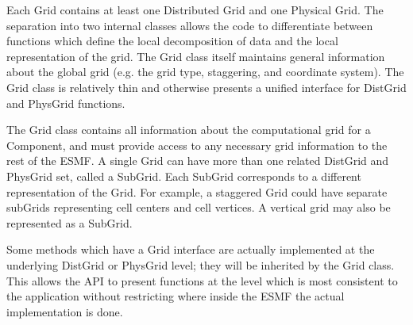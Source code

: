 

Each Grid contains at least one Distributed Grid and one Physical Grid.  
The separation into two internal classes allows the code to differentiate
between functions which define the local decomposition of data and
the local representation of the grid.  The Grid class itself maintains
general information about the global grid (e.g. the grid type, staggering,
and coordinate system).  The Grid class is relatively thin and
otherwise presents a unified interface for DistGrid and PhysGrid
functions.

The Grid class contains all information about the computational grid
for a Component, and must provide access to any necessary grid information
to the rest of the ESMF.  A single Grid can have more than one related
DistGrid and PhysGrid set, called a SubGrid.  Each SubGrid corresponds to
a different representation of the Grid.  For example, a staggered Grid could
have separate subGrids representing cell centers and cell vertices.  A
vertical grid may also be represented as a SubGrid.

Some methods which have a Grid interface are actually implemented
at the underlying DistGrid or PhysGrid level; they will be inherited
by the Grid class.  This allows the API to present functions at the 
level which is most consistent
to the application without restricting where inside the ESMF the actual
implementation is done.
